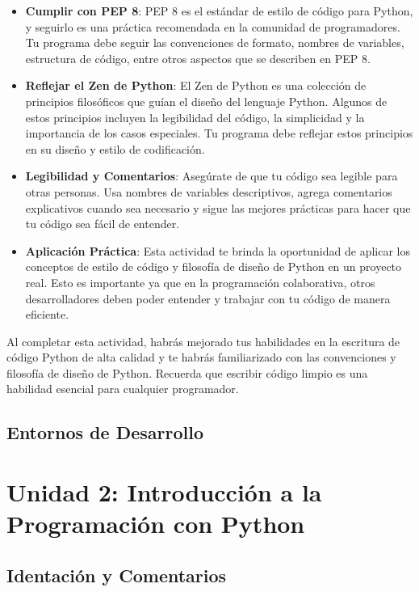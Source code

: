 \documentclass[
  a4paper,
  DIV=11,
  numbers=noendperiod,
  onepage,
  openany]{scrreprt}
\begin{document}
\begin{itemize}
\item
  \textbf{Cumplir con PEP 8}: PEP 8 es el estándar de estilo de código
  para Python, y seguirlo es una práctica recomendada en la comunidad de
  programadores. Tu programa debe seguir las convenciones de formato,
  nombres de variables, estructura de código, entre otros aspectos que
  se describen en PEP 8.
\item
  \textbf{Reflejar el Zen de Python}: El Zen de Python es una colección
  de principios filosóficos que guían el diseño del lenguaje Python.
  Algunos de estos principios incluyen la legibilidad del código, la
  simplicidad y la importancia de los casos especiales. Tu programa debe
  reflejar estos principios en su diseño y estilo de codificación.
\item
  \textbf{Legibilidad y Comentarios}: Asegúrate de que tu código sea
  legible para otras personas. Usa nombres de variables descriptivos,
  agrega comentarios explicativos cuando sea necesario y sigue las
  mejores prácticas para hacer que tu código sea fácil de entender.
\item
  \textbf{Aplicación Práctica}: Esta actividad te brinda la oportunidad
  de aplicar los conceptos de estilo de código y filosofía de diseño de
  Python en un proyecto real. Esto es importante ya que en la
  programación colaborativa, otros desarrolladores deben poder entender
  y trabajar con tu código de manera eficiente.
\end{itemize}

Al completar esta actividad, habrás mejorado tus habilidades en la
escritura de código Python de alta calidad y te habrás familiarizado con
las convenciones y filosofía de diseño de Python. Recuerda que escribir
código limpio es una habilidad esencial para cualquier programador.

\chapter{Entornos de Desarrollo}\label{entornos-de-desarrollo}

\part{Unidad 2: Introducción a la Programación con Python}

\chapter{Identación y Comentarios}\label{identaciuxf3n-y-comentarios}
\end{document}
